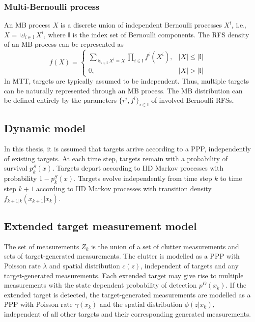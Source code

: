 \subsubsection{Multi-Bernoulli process}
An MB process $X$ is a discrete union of independent Bernoulli processes $X^i$, i.e., $X = \uplus_{i\in\mathbb{I}}X^i$, where $\mathbb{I}$ is the index set of Bernoulli components. The RFS density of an MB process can be represented as \cite{pmbmextended2}
\begin{equation}
f(X) = 
\begin{cases}
\sum_{\uplus_{i\in\mathbb{I}}X^i=X}\prod_{i\in\mathbb{I}}f^i(X^i), & |X| \leq |\mathbb{I}| \\
0, & |X| > |\mathbb{I}|
\end{cases}
\label{eq:mb}
\end{equation}
In MTT, targets are typically assumed to be independent. Thus, multiple targets can be naturally represented through an MB process. The MB distribution can be defined entirely by the parameters $\{r^i,f^i\}_{i\in\mathbb{I}}$ of involved Bernoulli RFSs.

\subsection{Dynamic model}
In this thesis, it is assumed that targets arrive according to a PPP, independently of existing targets. At each time step, targets remain with a probability of survival $p^S_k(x)$. Targets depart according to IID Markov processes with probability $1-p^S_k(x)$. Targets evolve independently from time step $k$ to time step $k+1$ according to IID Markov processes with transition density $f_{k+1|k}(x_{k+1}|x_{k})$. 

\subsection{Extended target measurement model}
The set of measurements $Z_k$ is the union of a set of clutter measurements and sets of target-generated measurements. The clutter is modelled as a PPP with Poisson rate $\lambda$ and spatial distribution $c(z)$, independent of targets and any target-generated measurements. Each extended target may give rise to multiple measurements with the state dependent probability of detection $p^D(x_k)$. If the extended target is detected, the target-generated measurements are modelled as a PPP with Poisson rate $\gamma(x_k)$ and the spatial distribution $\phi(z|x_k)$, independent of all other targets and their corresponding generated measurements. 


